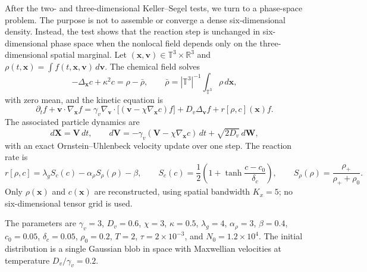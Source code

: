 \documentclass[a4paper,fleqn]{cas-sc}
\theoremstyle{definition}
\theoremstyle{remark}
\begin{document}
After the two- and three-dimensional Keller--Segel tests, we turn to a phase-space problem.  The purpose is not to assemble or converge a dense six-dimensional density.  Instead, the test shows that the reaction step is unchanged in six-dimensional phase space when the nonlocal field depends only on the three-dimensional spatial marginal.  Let $(\mathbf x,\mathbf v)\in\mathbb T^3\times\mathbb R^3$ and $\rho(t,\mathbf x)=\int f(t,\mathbf x,\mathbf v)\,d\mathbf v$.  The chemical field solves
\begin{equation}
 -\Delta_{\mathbf x}c+\kappa^2c=\rho-\bar\rho,
 \qquad
 \bar\rho=|\mathbb T^3|^{-1}\int_{\mathbb T^3}\rho\,d\mathbf x,
\label{equ:kinetic_ks_poisson}
\end{equation}
with zero mean, and the kinetic equation is
\begin{equation}
\partial_t f+\mathbf v\cdot\nabla_{\mathbf x}f
=\gamma_v\nabla_{\mathbf v}\cdot\bigl[(\mathbf v-\chi\nabla_{\mathbf x}c)f\bigr]
+D_v\Delta_{\mathbf v}f
+r[\rho,c](\mathbf x)f .
\label{equ:kinetic_ks}
\end{equation}
The associated particle dynamics are
\begin{equation}
 d\mathbf X=\mathbf V\,dt,
 \qquad
 d\mathbf V=-\gamma_v(\mathbf V-\chi\nabla_{\mathbf x}c)\,dt+\sqrt{2D_v}\,d\mathbf W,
\label{equ:kinetic_ks_sde}
\end{equation}
with an exact Ornstein--Uhlenbeck velocity update over one step.  The reaction rate is
\begin{equation}
 r[\rho,c]=\lambda_g S_c(c)-\alpha_\rho S_\rho(\rho)-\beta,
 \qquad
 S_c(c)=\frac12\left(1+\tanh\frac{c-c_0}{\delta_c}\right),
 \qquad
 S_\rho(\rho)=\frac{\rho_+}{\rho_+ + \rho_0}.
\label{equ:kinetic_ks_rate}
\end{equation}
Only $\rho(\mathbf x)$ and $c(\mathbf x)$ are reconstructed, using spatial bandwidth $K_x=5$; no six-dimensional tensor grid is used.

The parameters are $\gamma_v=3$, $D_v=0.6$, $\chi=3$, $\kappa=0.5$, $\lambda_g=4$, $\alpha_\rho=3$, $\beta=0.4$, $c_0=0.05$, $\delta_c=0.05$, $\rho_0=0.2$, $T=2$, $\tau=2\times10^{-3}$, and $N_0=1.2\times10^4$.  The initial distribution is a single Gaussian blob in space with Maxwellian velocities at temperature $D_v/\gamma_v=0.2$.
\end{document}
